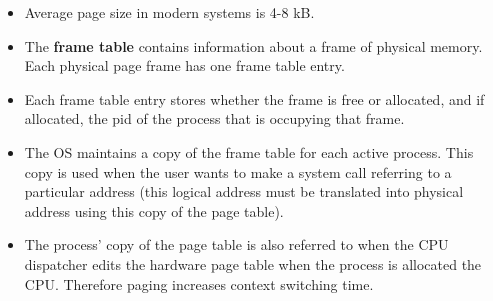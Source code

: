 \documentclass{article}
\theoremstyle{plain}
\theoremstyle{definition}
\begin{document}
\begin{itemize}
    \item Average page size in modern systems is 4-8 kB. 
    
    \item The \textbf{frame table} contains information about a frame of physical memory. Each physical page frame has one frame table entry.
    
    \item Each frame table entry stores whether the frame is free or allocated, and if allocated, the pid of the process that is occupying that frame. 
    
    \item The OS maintains a copy of the frame table for each active process. This copy is used when the user wants to make a system call referring to a particular address (this logical address must be translated into physical address using this copy of the page table).
    
    \item The process' copy of the page table is also referred to when the CPU dispatcher edits the hardware page table when the process is allocated the CPU. Therefore paging increases context switching time. 
\end{itemize}
\end{document}

